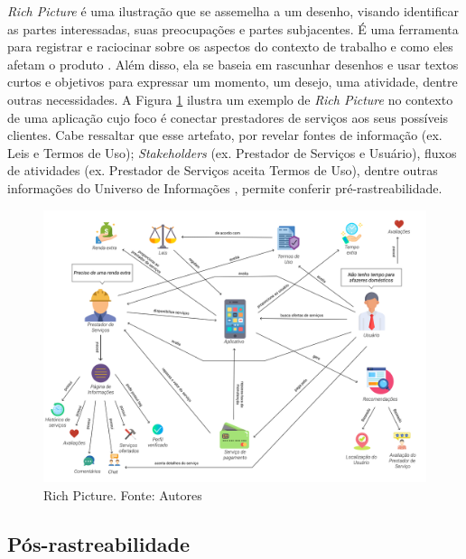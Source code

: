 \textit{Rich Picture} é uma ilustração que se assemelha a um desenho, visando identificar as partes interessadas, suas preocupações e partes subjacentes. É uma ferramenta para registrar e raciocinar sobre os aspectos do contexto de trabalho e como eles afetam o produto  \cite{10.1145/274430.274434}. Além disso, ela se baseia em rascunhar desenhos e usar textos curtos e objetivos para expressar um momento, um desejo, uma atividade, dentre outras necessidades. A Figura \ref{fig:rich_picture} ilustra um exemplo de \textit{Rich Picture} no contexto de uma aplicação cujo foco é conectar prestadores de serviços aos seus possíveis clientes. Cabe ressaltar que esse artefato, por revelar fontes de informação (ex. Leis e Termos de Uso); \textit{Stakeholders} (ex. Prestador de Serviços e Usuário), fluxos de atividades (ex. Prestador de Serviços aceita Termos de Uso), dentre outras informações do Universo de Informações \cite{leite2007livro}, permite conferir pré-rastreabilidade.

\begin{figure}[H]
    \begin{center}
        \includegraphics[scale=0.25]{figuras/Embasamento/rp_geral_v2.png}
        \caption{{Rich Picture. Fonte: Autores}}
        \label{fig:rich_picture}
    \end{center}
\end{figure}



\subsection{Pós-rastreabilidade}

